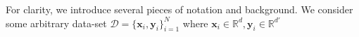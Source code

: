 \documentclass[11pt]{article}
\begin{document}
For clarity, we introduce several pieces of notation and background. We consider some arbitrary data-set $\mathcal{D} = \{\mathbf{x}_i, \mathbf{y}_i\}_{i = 1}^N$ where $\mathbf{x}_i \in \mathbb{R}^d, \mathbf{y}_i \in \mathbb{R}^{d'}$
\end{document}
